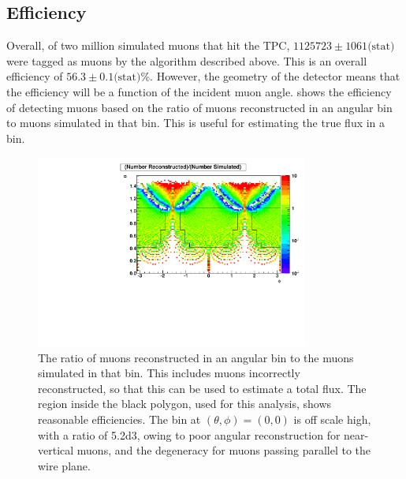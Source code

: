 \documentclass[herrin-thesis.tex]{subfiles}
\begin{document}
\subsection{Efficiency}
Overall, of two million simulated muons that hit the TPC, \(1125723\pm1061\text{(stat)}\) were tagged as muons by the algorithm described above. This is an overall efficiency of \(56.3 \pm 0.1\text{(stat)}\)\%. However, the geometry of the detector means that the efficiency will be a function of the incident muon angle.  shows the efficiency of detecting muons based on the ratio of muons reconstructed in an angular bin to muons simulated in that bin. This is useful for estimating the true flux in a bin.

 \begin{figure}[htp]
 \centering
 \includegraphics[width=0.8\textwidth]{./plots/muon_efficiency.pdf}
 \caption[Efficiency of reconstructing muons as a function of angle]{The ratio of muons reconstructed in an angular bin to the muons simulated in that bin. This includes muons incorrectly reconstructed, so that this can be used to estimate a total flux. The region inside the black polygon, used for this analysis, shows reasonable efficiencies. The bin at \((\theta, \phi) = (0, 0)\) is off scale high, with a ratio of \num{5.2d3}, owing to poor angular reconstruction for near-vertical muons, and the degeneracy for muons passing parallel to the wire plane.}
 \label{fig:muon_efficiency}
 \end{figure}
 
\end{document}
